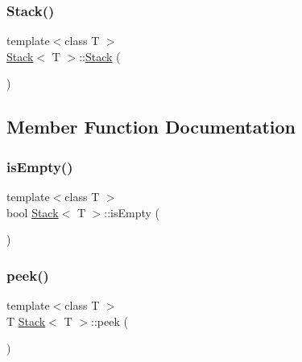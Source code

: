 \subsubsection{\texorpdfstring{Stack()}{Stack()}}
{\footnotesize\ttfamily template$<$class T $>$ \\
\hyperlink{classStack}{Stack}$<$ T $>$\+::\hyperlink{classStack}{Stack} (\begin{DoxyParamCaption}{ }\end{DoxyParamCaption})\hspace{0.3cm}{\ttfamily [inline]}}



\subsection{Member Function Documentation}
\mbox{\label{classStack_ad0db0d9b249e871bb7504ed89a99d3a7}} 
\subsubsection{\texorpdfstring{is\+Empty()}{isEmpty()}}
{\footnotesize\ttfamily template$<$class T $>$ \\
bool \hyperlink{classStack}{Stack}$<$ T $>$\+::is\+Empty (\begin{DoxyParamCaption}{ }\end{DoxyParamCaption})\hspace{0.3cm}{\ttfamily [inline]}}

\mbox{\label{classStack_adcb4774ac8aa94cbc19b461da9bdee3a}} 
\subsubsection{\texorpdfstring{peek()}{peek()}}
{\footnotesize\ttfamily template$<$class T $>$ \\
T \hyperlink{classStack}{Stack}$<$ T $>$\+::peek (\begin{DoxyParamCaption}{ }\end{DoxyParamCaption})\hspace{0.3cm}{\ttfamily [inline]}}

\mbox{\label{classStack_aa2ea0e8c3293648589dd734d52487408}} 
